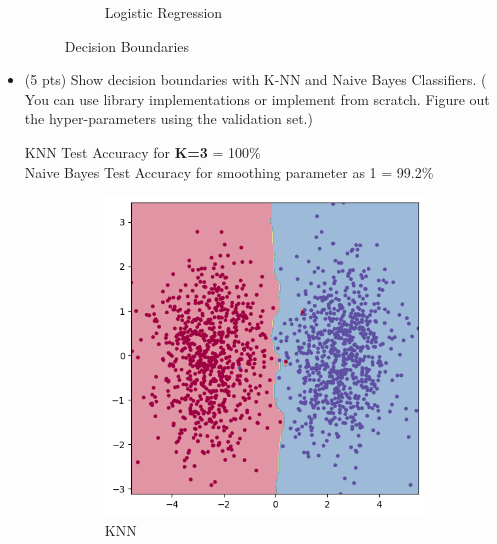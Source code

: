 \documentclass[a4paper]{article}
\theoremstyle{definition}
\newenvironment{soln}{
    \leavevmode\color{blue}\ignorespaces
}{}
\begin{document}
\begin{itemize}
\begin{soln}
\begin{figure}[H]
\begin{subfigure}[b]{0.5\textwidth}
                \caption{Logistic Regression}
            \end{subfigure}
            \caption{Decision Boundaries}
        \end{figure}
     \end{soln}
     \item (5 pts) Show decision boundaries with K-NN and Naive Bayes Classifiers. ( You can use library implementations or implement from scratch. Figure out the hyper-parameters using the validation set.) 
     
     \begin{soln}
         KNN Test Accuracy for \textbf{K=3} = 100\% \\
         Naive Bayes Test Accuracy for smoothing parameter as 1 = 99.2\%
         \begin{figure}[H]
            \centering
            \begin{subfigure}[b]{0.5\textwidth}
                \centering
                \includegraphics[scale=0.3]{Images/q2_2_1/KNN.png}
                \caption{KNN}
            \end{subfigure}%
            \begin{subfigure}[b]{0.5\textwidth}
                \centering

\end{subfigure}
\end{figure}
\end{soln}
\end{itemize}
\end{document}
